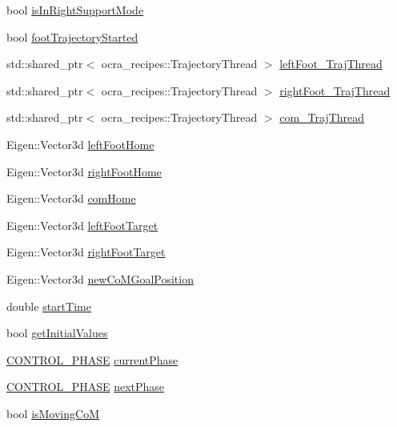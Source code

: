 \begin{DoxyCompactItemize}
\item 
bool \hyperlink{classSteppingDemoClient_a7697070e5db6c635aa2eff70bce29176}{is\+In\+Right\+Support\+Mode}
\item 
bool \hyperlink{classSteppingDemoClient_a6036e2d0b604648ca39e4d64b41a9d6e}{foot\+Trajectory\+Started}
\item 
std\+::shared\+\_\+ptr$<$ ocra\+\_\+recipes\+::\+Trajectory\+Thread $>$ \hyperlink{classSteppingDemoClient_afd18627088c2c12f172ff9e976da5330}{left\+Foot\+\_\+\+Traj\+Thread}
\item 
std\+::shared\+\_\+ptr$<$ ocra\+\_\+recipes\+::\+Trajectory\+Thread $>$ \hyperlink{classSteppingDemoClient_a8b4b931d41b47d9923417506fac107f3}{right\+Foot\+\_\+\+Traj\+Thread}
\item 
std\+::shared\+\_\+ptr$<$ ocra\+\_\+recipes\+::\+Trajectory\+Thread $>$ \hyperlink{classSteppingDemoClient_a9f3d1cdc49cc26a10f9b8fb0d0c68cab}{com\+\_\+\+Traj\+Thread}
\item 
Eigen\+::\+Vector3d \hyperlink{classSteppingDemoClient_acd4cb9dbe053979701574f5d1d4ef349}{left\+Foot\+Home}
\item 
Eigen\+::\+Vector3d \hyperlink{classSteppingDemoClient_ae2a3bdaafc7784b5afece8ae9ebaff7d}{right\+Foot\+Home}
\item 
Eigen\+::\+Vector3d \hyperlink{classSteppingDemoClient_aa018c1f2734d63f962be512461c9e010}{com\+Home}
\item 
Eigen\+::\+Vector3d \hyperlink{classSteppingDemoClient_a2360933e2902d1b1a374787bd67e14e7}{left\+Foot\+Target}
\item 
Eigen\+::\+Vector3d \hyperlink{classSteppingDemoClient_abfe6635a0ad50fa4baa6fa10b8c56d9e}{right\+Foot\+Target}
\item 
Eigen\+::\+Vector3d \hyperlink{classSteppingDemoClient_ab4a77111abbf3630280a64d17ac59eef}{new\+Co\+M\+Goal\+Position}
\item 
double \hyperlink{classSteppingDemoClient_af7b6e48319ef9d35fb975edc3bb2a137}{start\+Time}
\item 
bool \hyperlink{classSteppingDemoClient_aedd8bb5bca60afbdd2b8de3b5d1829d7}{get\+Initial\+Values}
\item 
\hyperlink{SteppingDemoClient_8h_af2a8507bf21c3ce9b0e67a23381251c6}{C\+O\+N\+T\+R\+O\+L\+\_\+\+P\+H\+A\+SE} \hyperlink{classSteppingDemoClient_afe0aa2a02ea8117d644bf5444a03ac62}{current\+Phase}
\item 
\hyperlink{SteppingDemoClient_8h_af2a8507bf21c3ce9b0e67a23381251c6}{C\+O\+N\+T\+R\+O\+L\+\_\+\+P\+H\+A\+SE} \hyperlink{classSteppingDemoClient_ab5a3b82049a9786162a60d0ae94f96d9}{next\+Phase}
\item 
bool \hyperlink{classSteppingDemoClient_ad7e3950d053af7c1aca33b3e7c3b20c5}{is\+Moving\+CoM}
\end{DoxyCompactItemize}


